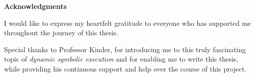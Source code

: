 \thispagestyle{empty}

\vspace*{20mm}

\begin{center}
    \makeatletter

    {\textbf{Acknowledgments}}

    \makeatother
\end{center}

\begin{flushleft}
    I would like to express my heartfelt gratitude to everyone who has supported me throughout the journey of this thesis.
    
    Special thanks to Professor Kinder, for introducing me to this truly fascinating topic of \textit{dynamic symbolic execution} and for enabling me to write this thesis, while providing his continuous support and help over the course of this project.
\capstartfalse

\end{flushleft}

\vspace{10mm}

\cleardoublepage{}
